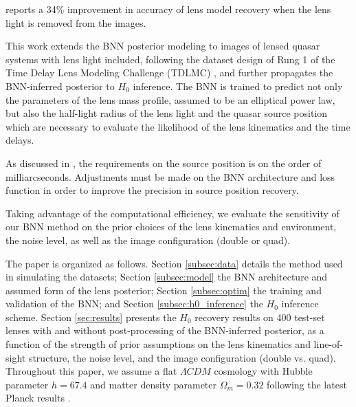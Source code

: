 \cite{pearson2019use} reports a 34\% improvement in accuracy of lens model recovery when the lens light is removed from the images. 

This work extends the BNN posterior modeling to images of lensed quasar systems with lens light included, following the dataset design of Rung 1 of the Time Delay Lens Modeling Challenge (TDLMC) \cite{ding2018time}, and further propagates the BNN-inferred posterior to $H_0$ inference. The BNN is trained to predict not only the parameters of the lens mass profile, assumed to be an elliptical power law, but also the half-light radius of the lens light and the quasar source position which are necessary to evaluate the likelihood of the lens kinematics and the time delays. 

As discussed in \cite{birrer2019astrometric}, the requirements on the source position is on the order of milliarcseconds. Adjustments must be made on the BNN architecture and loss function in order to improve the precision in source position recovery.

Taking advantage of the computational efficiency, we evaluate the sensitivity of our BNN method on the prior choices of the lens kinematics and environment, the noise level, as well as the image configuration (double or quad). 

The paper is organized as follows. Section \ref{subsec:data} details the method used in simulating the datasets; Section \ref{subsec:model} the BNN architecture and assumed form of the lens posterior; Section \ref{subsec:optim} the training and validation of the BNN; and Section \ref{subsec:h0_inference} the $H_0$ inference scheme. Section \ref{sec:results} presents the $H_0$ recovery results on 400 test-set lenses with and without post-processing of the BNN-inferred posterior, as a function of the strength of prior assumptions on the lens kinematics and line-of-sight structure, the noise level, and the image configuration (double vs. quad). Throughout this paper, we assume a flat $\Lambda CDM$ cosmology with Hubble parameter $h = 67.4$ and matter density parameter $\Omega_m = 0.32$ following the latest Planck results \cite{aghanim2018planck}. 